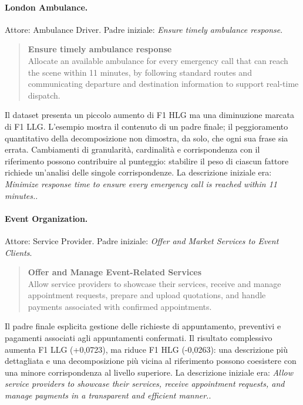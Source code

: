 \paragraph{London Ambulance.}
Attore: Ambulance Driver. Padre iniziale: \emph{Ensure timely ambulance response}.
\begin{quote}\small
\textbf{Ensure timely ambulance response}\\
Allocate an available ambulance for every emergency call that can reach the scene within 11 minutes, by following standard routes and communicating departure and destination information to support real-time dispatch.
\end{quote}
Il dataset presenta un piccolo aumento di F1 HLG ma una diminuzione marcata di F1 LLG. L'esempio mostra il contenuto di un padre finale; il peggioramento quantitativo della decomposizione non dimostra, da solo, che ogni sua frase sia errata. Cambiamenti di granularit\`a, cardinalit\`a e corrispondenza con il riferimento possono contribuire al punteggio: stabilire il peso di ciascun fattore richiede un'analisi delle singole corrispondenze.
La descrizione iniziale era: \emph{Minimize response time to ensure every emergency call is reached within 11 minutes.}.
\paragraph{Event Organization.}
Attore: Service Provider. Padre iniziale: \emph{Offer and Market Services to Event Clients}.
\begin{quote}\small
\textbf{Offer and Manage Event-Related Services}\\
Allow service providers to showcase their services, receive and manage appointment requests, prepare and upload quotations, and handle payments associated with confirmed appointments.
\end{quote}
Il padre finale esplicita gestione delle richieste di appuntamento, preventivi e pagamenti associati agli appuntamenti confermati. Il risultato complessivo aumenta F1 LLG (+0,0723), ma riduce F1 HLG (-0,0263): una descrizione pi\`u dettagliata e una decomposizione pi\`u vicina al riferimento possono coesistere con una minore corrispondenza al livello superiore.
La descrizione iniziale era: \emph{Allow service providers to showcase their services, receive appointment requests, and manage payments in a transparent and efficient manner.}.
